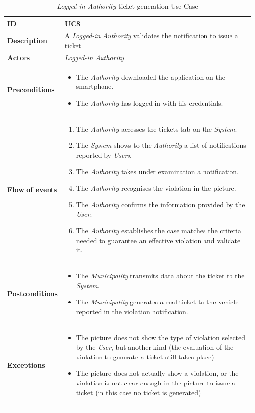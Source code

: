 \documentclass {article}
\begin{document}
		\begin{longtable}{| p{3 cm} | p{10.5 cm} |} 
			\hline
			{\bf ID} & UC8 \\
			\hline
			{\bf Description} & A {\it Logged-in Authority} validates the  notification to issue a ticket \\
			\hline
			{\bf Actors} & {\it Logged-in Authority}\\
			\hline
			{\bf Preconditions} & \begin{itemize}
								\item The {\it Authority} downloaded the application on the smartphone.
								  \item The {\it Authority} has logged in with his credentials.
								  \end{itemize}	\\
			\hline
			{\bf Flow of events} &	\begin{enumerate}
								  \item The {\it Authority} accesses the tickets tab on the {\it System}.
								  \item The {\it System} shows to the {\it Authority} a list of notifications reported by {\it Users}.
								  \item The {\it Authority} takes under examination a notification.
								  \item The {\it Authority} recognises the violation in the picture.
								  \item The {\it Authority} confirms the information provided by the {\it User}.
								  \item The {\it Authority} establishes the case matches the criteria needed to guarantee an effective violation and validate it.
								  \end{enumerate}	\\
			\hline
			{\bf Postconditions} & \begin{itemize}
								  \item The {\it Municipality} transmits data about the ticket to the {\it System}.
								  \item The {\it Municipality} generates a real ticket to the vehicle reported in the violation notification.
								  \end{itemize}	 \\
			\hline
			{\bf Exceptions} & 	\begin{itemize}
								  \item The picture does not show the type of violation selected by the {\it User}, but another kind (the evaluation of the violation to generate a ticket still takes place)
								  \item The picture does not actually show a violation, or the violation is not clear enough in the picture to issue a ticket (in this case no ticket is generated)
								  \end{itemize}	\\
			\hline
			\caption{{\it Logged-in Authority} ticket generation Use Case}
			\end{longtable}
			\pagebreak
			
\end{document}

